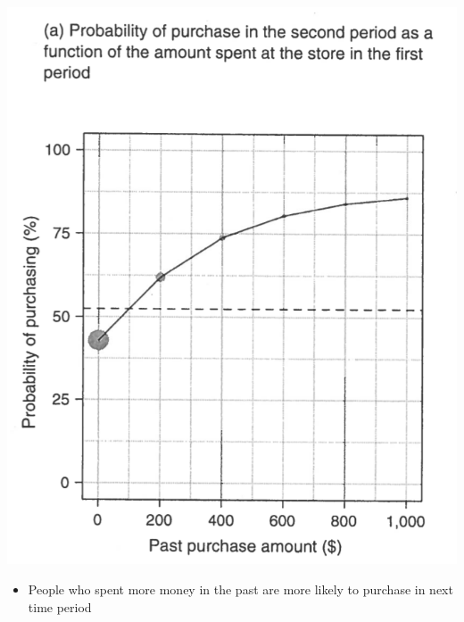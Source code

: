 \documentclass[aspectratio=169]{beamer}
\begin{document}
\begin{frame}

\begin{center}
\includegraphics[height=0.8\textheight]{figures/goel_predicting_2014_fig8a}
\end{center}

\vfill

\begin{itemize}
\item People who spent more money in the past are more likely to purchase in next time period
\end{itemize}

\end{frame}
\end{document}
